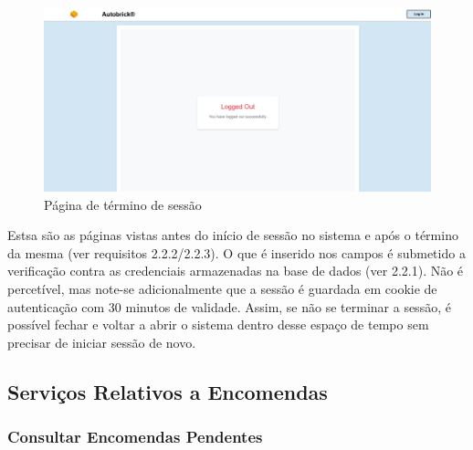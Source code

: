                             \begin{figure}[h!]
                                \centering
                                \includegraphics[width=0.8\linewidth, frame]{images/Site/Logout.pdf}
                                \caption{Página de término de sessão}
                                \label{fig:Página de logout}
                            \end{figure}

                    Estsa são as páginas vistas antes do início de sessão no sistema e após o término da mesma (ver requisitos 2.2.2/2.2.3). O que é inserido nos campos é submetido a verificação contra as credenciais armazenadas na base de dados (ver 2.2.1). Não é percetível, mas note-se adicionalmente que a sessão é guardada em cookie de autenticação com 30 minutos de validade. Assim, se não se terminar a sessão, é possível fechar e voltar a abrir o sistema dentro desse espaço de tempo sem precisar de iniciar sessão de novo.


            \clearpage
            \subsection{Serviços Relativos a Encomendas}
                \subsubsection{Consultar Encomendas Pendentes}

